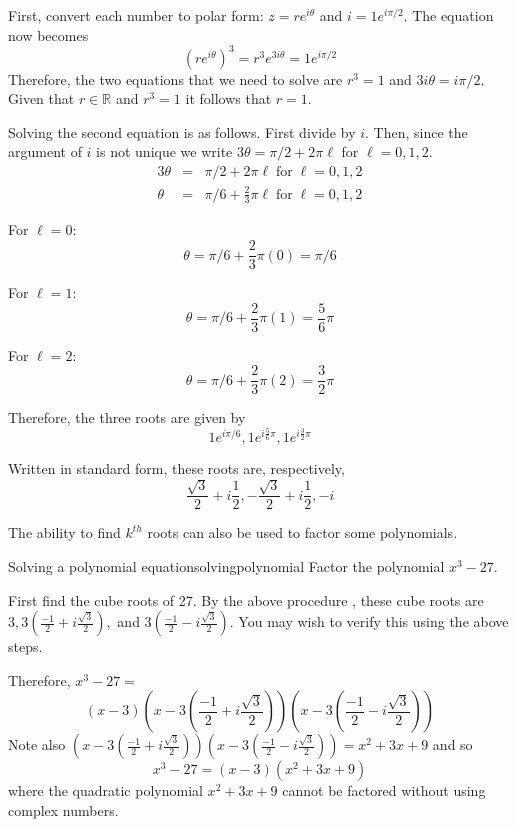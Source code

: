 \begin{solution}
First, convert each number to polar form: $z = re^{i\theta}$ and $i = 1 e^{i \pi/2}$. The equation now becomes
\[
(re^{i\theta})^3 = r^3 e^{3i\theta} = 1 e^{i \pi/2}
\]
Therefore, the two equations that we need to solve are $r^3 = 1$ and $3i\theta = i \pi/2$. Given that $r \in \mathbb{R}$ and $r^3 = 1$ it follows that $r=1$. 

Solving the second equation is as follows. First divide by $i$. Then, since the argument of $i$ is not unique we write $3\theta = \pi/2 + 2\pi\ell$ for $\ell = 0,1,2$. 
\begin{eqnarray*}
3\theta &=& \pi/2 + 2\pi\ell \; \mbox{for} \; \ell = 0,1,2 \\
\theta &=& \pi/6 + \frac{2}{3} \pi\ell \; \mbox{for} \; \ell = 0,1,2 
\end{eqnarray*}

For $\ell = 0$:
\[
\theta = \pi/6 + \frac{2}{3} \pi (0) = \pi/6
\]

For $\ell = 1$:
\[
\theta = \pi/6 + \frac{2}{3} \pi(1) = \frac{5}{6} \pi
\]

For $\ell = 2$:
\[
\theta = \pi/6 + \frac{2}{3} \pi(2) = \frac{3}{2} \pi
\]

Therefore, the three roots are given by \[
1e^{i \pi/6}, 1e^{i \frac{5}{6}\pi}, 1e^{i \frac{3}{2}\pi}
\]

Written in standard form, these roots are, respectively,
\[
\frac{\sqrt{3}}{2} + i \frac{1}{2}, -\frac{\sqrt{3}}{2} + i \frac{1}{2}, -i
\]

\end{solution}

The ability to find $k^{th}$ roots can also be used to factor some
polynomials.

\begin{example}{Solving a polynomial equation}{solvingpolynomial}
Factor the polynomial $x^{3}-27.$
\end{example}

\begin{solution}
First find the cube roots of 27. By the above procedure
, these cube roots
are $3,3\left( \displaystyle
\frac{-1}{2}+i\displaystyle\frac{\sqrt{3}}{2}\right) ,$ and $3\left( 
\displaystyle\frac{-1}{2}-i\displaystyle\frac{\sqrt{3}}{2}\right) $. You may wish to verify 
this using the above steps.

Therefore, $x^{3}-27 =$
\begin{equation*}
 \left( x-3\right) \left( x-3\left( \frac{-1}{2}+i\frac{\sqrt{3}}{2}\right)
\right) \left( x-3\left( \frac{-1}{2}-i\frac{\sqrt{3}}{2}\right) \right) 
\end{equation*}
Note also $\left( x-3\left( \frac{-1}{2}+i\frac{\sqrt{3}}{2}\right) \right)
\left( x-3\left( \frac{-1}{2}-i\frac{\sqrt{3}}{2}\right) \right)
=\allowbreak x^{2}+3x+9$ and so
\begin{equation*}
x^{3}-27=\left( x-3\right) \left( x^{2}+3x+9\right)
\end{equation*}
where the quadratic polynomial $x^{2}+3x+9$ cannot be factored without using
complex numbers.
\end{solution}

